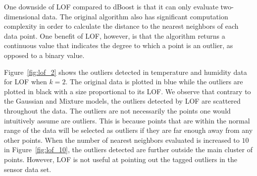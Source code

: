 One downside of LOF compared to dBoost is that it can only evaluate two-dimensional data.
The original algorithm also has significant computation complexity in order to calculate the distance to the nearest neighbors of each data point.
One benefit of LOF, however, is that the algorithm returns a continuous value that indicates the degree to which a point is an outlier, as opposed to a binary value.

Figure~\ref{fig:lof_2} shows the outliers detected in temperature and humidity data for LOF when $k=2$.
The original data is plotted in blue while the outliers are plotted in black with a size proportional to its LOF.
We observe that contrary to the Gaussian and Mixture models, the outliers detected by LOF are scattered throughout the data.
The outliers are not necessarily the points one would intuitively assume are outliers.
This is because points that are within the normal range of the data will be selected as outliers if they are far enough away from any other points.
When the number of nearest neighbors evaluated is increased to $10$ in Figure~\ref{fig:lof_10}, the outliers detected are further outside the main cluster of points.
However, LOF is not useful at pointing out the tagged outliers in the sensor data set.


